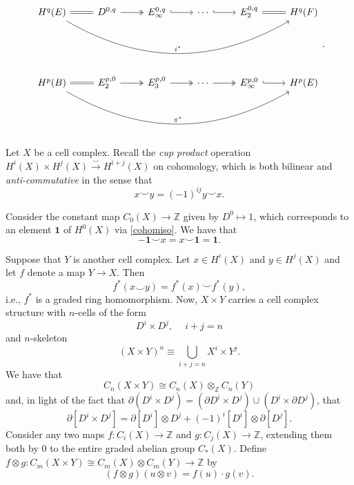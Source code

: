 \documentclass[10pt,letterpaper,cm]{nupset}
\theoremstyle{definition}
\theoremstyle{theorem}
\theoremstyle{remark}
\newcommand{\Z}{\mathbb Z}
\newcommand{\1}{\mathbb{1}}
\newcommand{\0}{\vec 0}
\begin{document}
\[
\begin{tikzcd}
H^q(E) \arrow[r, equals] \arrow[rrrrr, "i^{\ast}", bend right]   & {D^{0,q}} \arrow[r, two heads]   & {E_{\infty}^{0,q}} \arrow[r, hook] & \cdots \arrow[r, hook]      & {E_2^{0,q}} \arrow[r, equals]              & H^q(F) \\
                                                         &                                  &                                    &                             &                                    &        \\
                                                                                                                  &                                  &                                    &                             &                                    &        \\
H^p(B) \arrow[r, equals] \arrow[rrrrr, "\pi^{\ast}", bend right] & {E_2^{p,0}} \arrow[r, two heads] & {E_3^{p,0}} \arrow[r, two heads]   & \cdots \arrow[r, two heads] & {E_{\infty}^{p,0}} \arrow[r, hook] & H^p(E)
\end{tikzcd}.
\]

\bigskip

Let $X$ be a cell complex. Recall the \textit{cup product} operation $H^i(X) \times H^j(X) \overset{\smile }{\longrightarrow} H^{i+j}(X)$ on cohomology, which is both bilinear and \textit{anti-commutative} in the sense that
\[
x \smile y = \left({-1}\right)^{ij}y \smile x.
\]

Consider the constant map $C_0(X) \to \Z$ given by $D^0 \mapsto 1$, which corresponds to an element $\mathbf{1}$ of $H^0(X)$ via \cref{cohomiso}. We have that
\[
{-\mathbf{1}}\smile x = x \smile \mathbf{1} = \mathbf{1}.
\]

\smallskip

Suppose that $Y$ is another cell complex. Let $x \in H^i(X)$ and $y\in H^j(X)$ and let $f$ denote a map $Y \to X$. Then 
\[
f^{\ast}(x\smile y) =f^{\ast}(x)\smile f^{\ast}(y),
\] i.e., $f^{\ast}$ is a graded ring homomorphism. Now, $X \times Y$ carries a cell complex structure with $n$-cells of the form 
\[
D^i \times D^j, \  \quad i+j =n
\] and $n$-skeleton
\[
\left(X\times Y\right)^n \equiv \bigcup_{i+j =n}X^i \times Y^j.
\] We have that 
\[
C_n(X \times Y) \cong C_n(X) \otimes_{\Z} C_n(Y)
\] and, in light of the fact that $\partial(D^i \times D^j) = \left(\partial{D^i} \times D^j\right) \cup \left(D^i \times \partial{D^j}\right)$, that
\[
\partial[D^i \times D^j] = \partial[D^i] \otimes D^j + ({-1})^i[D^i]\otimes \partial[D^j].
\]
Consider any two maps $f: C_i(X) \to \Z$ and $g: C_j(X) \to \Z$, extending them both by $0$ to the entire graded abelian group $C_{\ast}(X)$. Define $f \otimes g : C_m(X \times Y)\cong C_m(X) \otimes C_m(Y) \to \Z$ by 
\[
\left(f \otimes g\right)\left(u \otimes v\right) = f(u) \cdot g(v).
\]
\end{document}
